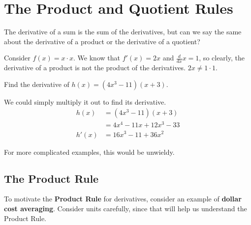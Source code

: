 \section{The Product and Quotient Rules}
\label{sec:prod-quot}


The derivative of a sum is the sum of the derivatives, but can we say the same about the derivative of a product or the derivative of a quotient?

\begin{example} Consider $f(x) = x\cdot x$. We know that $f'(x) = 2x$ and $\frac{d}{dx}x = 1$, so clearly, the derivative of a product is not the product of the derivatives. $2x \ne 1\cdot 1$.
\end{example}

\begin{example}
  \label{ex:2-8-1}
Find the derivative of $h(x)=(4x^3-11)(x+3)$.

\begin{solution} We could simply multiply it out to find its derivative.
\begin{align*}
		h(x) &= \left(4x^3-11\right)(x+3)\\
		 &= 4x^4-11x+12x^3-33\\
		h'(x) &= 16x^3-11+36x^2
	\end{align*}
\end{solution}\end{example}
For more complicated examples, this would be unwieldy.

\subsection{The Product Rule}

To motivate the {\bf Product Rule} for derivatives, consider an example of {\bf dollar cost averaging}. Consider units carefully, since that will help us understand the Product Rule.

